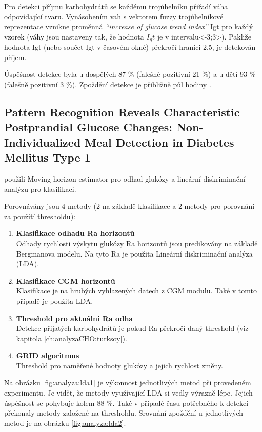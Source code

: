Pro detekci příjmu karbohydrátů se každému trojúhelníku přiřadí váha odpovídající tvaru. Vynásobením vah s vektorem fuzzy trojúhelníkové reprezentace vznikne proměnná \textit{“increase of glucose trend index”} Igt pro každý vzorek (váhy jsou nastaveny tak, že hodnota $I_gt$ je v intervalu<-3;3>). Pakliže hodnota Igt (nebo součet Igt v časovém okně) překročí hranici 2,5, je detekován příjem.

Úspěšnost detekce byla u dospělých 87 \% (falešně pozitivní 21 \%) a u dětí 93 \% (falešně pozitivní 3 \%). Zpoždění detekce je přibližně půl hodiny \citep{analyzaCHO.WaveletEst}.


\subsection{Pattern Recognition Reveals Characteristic Postprandial Glucose Changes: Non-Individualized Meal Detection in Diabetes Mellitus Type 1}
\label{ch:analyzaCHO:lda}

\citet{analyzaCHO.LDA} použili Moving horizon estimator pro odhad glukózy a lineární diskriminační analýzu pro klasifikaci.

Porovnávány jsou 4 metody (2 na základě klasifikace a 2 metody pro porovnání za použití thresholdu):

\begin{enumerate}
\item \textbf{Klasifikace odhadu Ra horizontů} \\
Odhady rychlosti výskytu glukózy Ra horizontů jsou predikovány na základě Bergmanova modelu. Na tyto Ra je použita Lineární diskriminační analýza (LDA).
\item \textbf{Klasifikace CGM horizontů} \\
Klasifikace je na hrubých vyhlazených datech z CGM modulu. Také v tomto případě je použita LDA.
\item \textbf{Threshold pro aktuální Ra odha} \\
Detekce přijatých karbohydrátů je pokud Ra překročí daný threshold (viz kapitola \ref{ch:analyzaCHO:turksoy}).
\item \textbf{GRID algoritmus} \\
Threshold pro naměřené hodnoty glukózy a jejich rychlost změny.
\end{enumerate}

Na obrázku \ref{fig:analyza:lda1} je výkonnost jednotlivých metod při provedeném experimentu. Je vidět, že metody využívající LDA si vedly výrazně lépe. Jejich úspěšnost se pohybuje kolem 88 \%. Také v případě času potřebného k detekci překonaly metody založené na thresholdu. Srovnání zpoždění u jednotlivých metod je na obrázku \ref{fig:analyza:lda2}.

